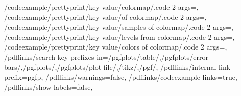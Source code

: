 {    %
    /codeexample/prettyprint/key value/colormap/.code 2 args={},
    /codeexample/prettyprint/key value/of colormap/.code 2 args={},
    /codeexample/prettyprint/key value/samples of colormap/.code 2 args={},
    /codeexample/prettyprint/key value/levels from colormap/.code 2 args={},
    /codeexample/prettyprint/key value/colors of colormap/.code 2 args={},
    /pdflinks/search key prefixes in={/pgfplots/table/,/pgfplots/error bars/,/pgfplots/,/pgfplots/plot file/,/tikz/,/pgf/},
    /pdflinks/internal link prefix=pgfp,
    /pdflinks/warnings=false,
    /pdflinks/codeexample links=true,
    /pdflinks/show labels=false,
}%


%
\def\declaretext#1{\texttt{\declare{#1}}}

%
\def\declarelabel#1{%
    \texttt{\declare{#1}}%
    \pgfmanualpdflabel{#1}{}%
}

\def\pgfmanualbar{\char`\|}
\makeatletter



%
\def\pgfplotsmanualenableexternalizationofexpensive{%
    \pgfplotsmanual@enable@externalization@for@expensivetrue
    \tikzexternalize[
        prefix=figures/expensiveexamples/,%
        figure name={},
        export=false, %
        mode=list and make,
        verbose=false,
    ]
    \tikzifexternalizing{%
        \nofiles
        \pgfkeys{/pdflinks/codeexample links=false}%
    }{}%
}%

